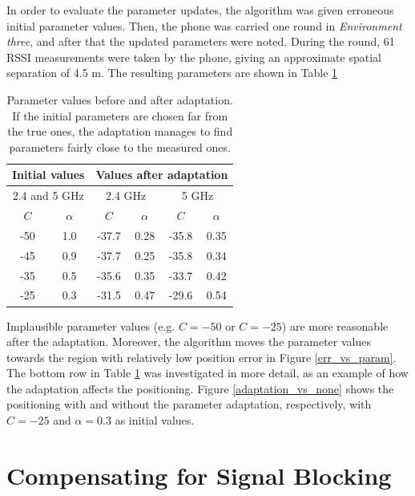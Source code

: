 \documentclass{LTHthesis}
\begin{document}
In order to evaluate the parameter updates, the algorithm was given erroneous initial parameter values. Then, the phone was carried one round in \emph{Environment three}, and after that the updated parameters were noted. During the round, 61 RSSI measurements were taken by the phone, giving an approximate spatial separation of 4.5 m. The resulting parameters are shown in Table \ref{table:parameter_adaptation}

\begin{table}[!hbt]
\begin{center}
\begin{tabular}{|c|c|c|c|c|c|}
\hline
\multicolumn{2}{|c|}{Initial values}
&\multicolumn{4}{|c|}{Values after adaptation} \\
\hline
\hline
\multicolumn{2}{|c|}{2.4 and 5 GHz}
&\multicolumn{2}{|c|}{2.4 GHz}
&\multicolumn{2}{|c|}{5 GHz} \\

\hline
$C$ & $\alpha$ & $C$ & $\alpha$& $C$& $\alpha$\\
\hline
-50 & 1.0 & -37.7 & 0.28 & -35.8 & 0.35\\
\hline
-45 & 0.9 & -37.7 & 0.25 & -35.8 & 0.34\\
\hline
-35 & 0.5 & -35.6 & 0.35 & -33.7 & 0.42\\
\hline
-25 & 0.3 & -31.5 & 0.47 & -29.6 & 0.54\\
\hline
\end{tabular}
\end{center}
\caption{Parameter values before and after adaptation. If the initial parameters are chosen far from the true ones, the adaptation manages to find parameters fairly close to the measured ones. }\label{table:parameter_adaptation}
\end{table}

Implausible parameter values (e.g. $C = -50$ or $C = -25$) are more reasonable after the adaptation. Moreover, the algorithm moves the parameter values towards the region with relatively low position error in Figure \ref{err_vs_param}. The bottom row in Table \ref{table:parameter_adaptation} was investigated in more detail, as an example of how the adaptation affects the positioning. Figure \ref{adaptation_vs_none} shows the positioning with and without the parameter adaptation, respectively, with $C = -25$ and $\alpha = 0.3$ as initial values.

\section{Compensating for Signal Blocking} %
%
\end{document}
